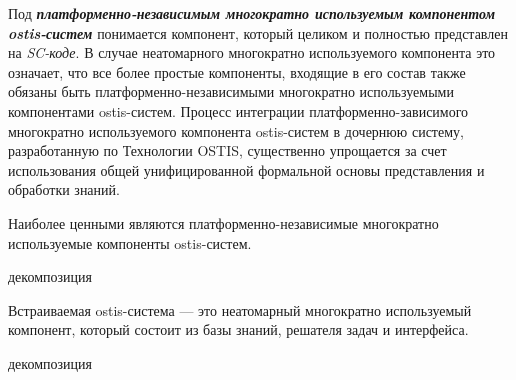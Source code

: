 Под \textbf{\textit{платформенно-независимым многократно используемым компонентом ostis-систем}} понимается компонент, который целиком и полностью представлен на \textit{SC-коде}. В случае неатомарного многократно используемого компонента это означает, что все более простые компоненты, входящие в его состав также обязаны быть платформенно-независимыми многократно используемыми компонентами ostis-систем. Процесс интеграции платформенно-зависимого многократно используемого компонента ostis-систем в дочернюю систему, разработанную по Технологии OSTIS, существенно упрощается за счет использования общей унифицированной формальной основы представления и обработки знаний.

Наиболее ценными являются платформенно-независимые многократно используемые компоненты ostis-систем.

\begin{SCn}
\begin{scnindent}
	\begin{scneqtoset}
		\begin{scnindent}
			\begin{scnrelfromset}{декомпозиция}
			\end{scnrelfromset}
		\end{scnindent}
	\end{scneqtoset}
\end{scnindent}
\end{SCn}


Встраиваемая ostis-система --- это неатомарный многократно используемый компонент, который состоит из базы знаний, решателя задач и интерфейса. 

\begin{SCn}
	\begin{scnrelfromset}{декомпозиция}
	\end{scnrelfromset}
\end{SCn}


